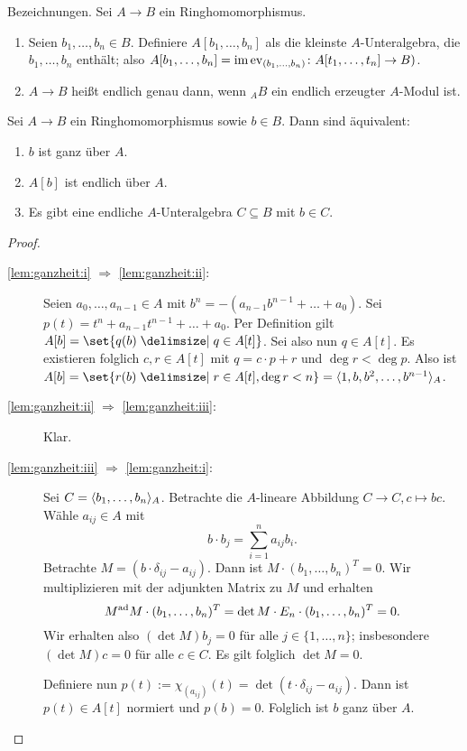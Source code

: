 \documentclass[12pt,a4paper]{scrartcl}
\theoremstyle{cplain}
\theoremstyle{cdef}
\begin{document}
\medskip

Bezeichnungen. Sei $A\to B$ ein Ringhomomorphismus.
\begin{enumerate}
	\item Seien $b_1,\dots,b_n\in B$. Definiere $A[b_1,\dots, b_n]$ als die kleinste $A$-Unteralgebra, die $b_1,\dots, b_n$ enthält; also $A[b_1,\dots, b_n] = \operatorname{im} \operatorname{ev}_{(b_1,\dots, b_n)}\colon A[t_1,\dots, t_n]\to B)$.
	\item $A\to B$ heißt endlich genau dann, wenn ${}_AB$ ein endlich erzeugter $A$-Modul ist.
\end{enumerate}

\begin{lem} \label{lem:ganzheit}
	Sei $A\to B$ ein Ringhomomorphismus sowie $b\in B$. Dann sind äquivalent:
	\begin{enumerate}
		\item $b$ ist ganz über $A$. \label{lem:ganzheit:i}
		\item $A[b]$ ist endlich über $A$. \label{lem:ganzheit:ii}
		\item Es gibt eine endliche $A$-Unteralgebra $C\subseteq B$ mit $b\in C$. \label{lem:ganzheit:iii}
	\end{enumerate}
\end{lem}


\begin{proof}
	\leavevmode
	\begin{description}
		\item[\ref{lem:ganzheit:i} $\Rightarrow$ \ref{lem:ganzheit:ii}:] Seien $a_0,\dots, a_{n-1}\in A$ mit $b^n = -(a_{n-1}b^{n-1}+\dots+a_0)$. Sei $p(t) = t^n+a_{n-1}t^{n-1}+\dots + a_0$. Per Definition gilt $A[b] = \set{q(b)\given q\in A[t]}$. Sei also nun $q\in A[t]$. Es existieren folglich $c,r\in A[t]$ mit $q = c\cdot p +r $ und $\deg r < \deg p$. Also ist $A[b] = \set{r(b)\given r\in A[t], \deg r <n} = \<1, b, b^2,\dots, b^{n-1}\>_A$.
		
		\item[\ref{lem:ganzheit:ii} $\Rightarrow$ \ref{lem:ganzheit:iii}:] Klar.
		\item[\ref{lem:ganzheit:iii} $\Rightarrow$ \ref{lem:ganzheit:i}:] Sei $C = \langle b_1, \dots, b_n\rangle_A$. Betrachte die $A$-lineare Abbildung $C\to C, c\mapsto bc$. Wähle $a_{ij}\in A$ mit 
		\[b\cdot b_j = \sum_{i=1}^{n}a_{ij}b_i.\]
		Betrachte $M = (b\cdot \delta_{ij}-a_{ij})$. Dann ist $M\cdot (b_1,\dots, b_n)^T = 0$. Wir multiplizieren mit der adjunkten Matrix zu $M$ und erhalten
		\[M^{\operatorname{ad}} M \cdot (b_1,\ldots,b_n)^T = \det M \cdot E_n \cdot (b_1,\dots, b_n)^T = 0.\]
		Wir erhalten also $(\det M)b_j = 0$ für alle $j\in\{1,\dots, n\}$; insbesondere $(\det M)c = 0$ für alle $c\in C$. Es gilt folglich $\det M  = 0$.
		
		Definiere nun $p(t) := \chi_{(a_{ij})}(t) = \det (t\cdot \delta_{ij}-a_{ij})$. Dann ist $p(t)\in A[t]$ normiert und $p(b) = 0$. Folglich ist $b$ ganz über $A$.
		\qedhere
	\end{description}
\end{proof}
\end{document}

